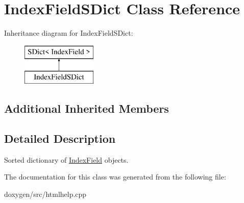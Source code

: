 \hypertarget{class_index_field_s_dict}{}\section{Index\+Field\+S\+Dict Class Reference}
\label{class_index_field_s_dict}
Inheritance diagram for Index\+Field\+S\+Dict\+:\begin{figure}[H]
\begin{center}
\leavevmode
\includegraphics[height=2.000000cm]{class_index_field_s_dict}
\end{center}
\end{figure}
\subsection*{Additional Inherited Members}


\subsection{Detailed Description}
Sorted dictionary of \mbox{\hyperlink{struct_index_field}{Index\+Field}} objects. 

The documentation for this class was generated from the following file\+:\begin{DoxyCompactItemize}
\item 
doxygen/src/htmlhelp.\+cpp\end{DoxyCompactItemize}
